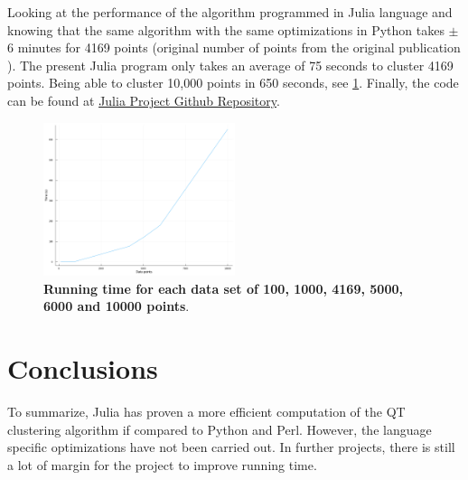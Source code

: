 Looking at the performance of the algorithm programmed in Julia language and knowing that the same algorithm with the same optimizations in Python takes $\pm$ 6 minutes for 4169 points (original number of points from the original publication \cite{Heyer}). The present Julia program only takes an average of 75 seconds to cluster 4169 points. Being able to cluster 10,000 points in 650 seconds, see \ref{fig:time}. Finally, the code can be found at \href{https://github.com/laurasansc/learning_julia}{Julia Project Github Repository}. \\

\begin{figure}[h]
    \centering
    \includegraphics[width=0.5\textwidth]{images/times.png}
    \caption{\textbf{Running time for each data set of 100, 1000, 4169, 5000, 6000 and 10000 points}.}
    \label{fig:time}
\end{figure}

\section*{Conclusions}
To summarize, Julia has proven a more efficient computation of the QT clustering algorithm if compared to Python and Perl. However, the language specific optimizations have not been carried out. In further projects, there is still a lot of margin for the project to improve running time. 

